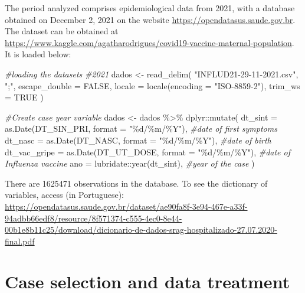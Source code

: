 \documentclass[
]{article}
\newenvironment{Shaded}{\begin{snugshade}}{\end{snugshade}}
\newcommand{\AttributeTok}[1]{\textcolor[rgb]{0.77,0.63,0.00}{#1}}
\newcommand{\CommentTok}[1]{\textcolor[rgb]{0.56,0.35,0.01}{\textit{#1}}}
\newcommand{\ConstantTok}[1]{\textcolor[rgb]{0.00,0.00,0.00}{#1}}
\newcommand{\FunctionTok}[1]{\textcolor[rgb]{0.00,0.00,0.00}{#1}}
\newcommand{\NormalTok}[1]{#1}
\newcommand{\OtherTok}[1]{\textcolor[rgb]{0.56,0.35,0.01}{#1}}
\newcommand{\SpecialCharTok}[1]{\textcolor[rgb]{0.00,0.00,0.00}{#1}}
\newcommand{\StringTok}[1]{\textcolor[rgb]{0.31,0.60,0.02}{#1}}
\begin{document}
The period analyzed comprises epidemiological data from 2021, with a
database obtained on December 2, 2021 on the website
\url{https://opendatasus.saude.gov.br}. The dataset can be obtained at
\url{https://www.kaggle.com/agatharodrigues/covid19-vaccine-maternal-population}.
It is loaded below:

\begin{Shaded}
\begin{Highlighting}[]
\CommentTok{\#loading the datasets}
\CommentTok{\#2021}
\NormalTok{dados }\OtherTok{\textless{}{-}} \FunctionTok{read\_delim}\NormalTok{(}
  \StringTok{"INFLUD21{-}29{-}11{-}2021.csv"}\NormalTok{,}
  \StringTok{";"}\NormalTok{,}
  \AttributeTok{escape\_double =} \ConstantTok{FALSE}\NormalTok{,}
  \AttributeTok{locale =} \FunctionTok{locale}\NormalTok{(}\AttributeTok{encoding =} \StringTok{"ISO{-}8859{-}2"}\NormalTok{),}
  \AttributeTok{trim\_ws =} \ConstantTok{TRUE}
\NormalTok{)}

\CommentTok{\#Create case year variable}
\NormalTok{dados }\OtherTok{\textless{}{-}}\NormalTok{  dados }\SpecialCharTok{\%\textgreater{}\%}
\NormalTok{  dplyr}\SpecialCharTok{::}\FunctionTok{mutate}\NormalTok{(}
    \AttributeTok{dt\_sint =} \FunctionTok{as.Date}\NormalTok{(DT\_SIN\_PRI, }\AttributeTok{format =} \StringTok{"\%d/\%m/\%Y"}\NormalTok{), }\CommentTok{\#date of first symptoms}
    \AttributeTok{dt\_nasc =} \FunctionTok{as.Date}\NormalTok{(DT\_NASC, }\AttributeTok{format =} \StringTok{"\%d/\%m/\%Y"}\NormalTok{), }\CommentTok{\#date of birth}
    \AttributeTok{dt\_vac\_gripe =} \FunctionTok{as.Date}\NormalTok{(DT\_UT\_DOSE, }\AttributeTok{format =} \StringTok{"\%d/\%m/\%Y"}\NormalTok{), }\CommentTok{\#date of Influenza vaccine}
    \AttributeTok{ano =}\NormalTok{ lubridate}\SpecialCharTok{::}\FunctionTok{year}\NormalTok{(dt\_sint), }\CommentTok{\#year of the case}
\NormalTok{  )}
\end{Highlighting}
\end{Shaded}

There are 1625471 observations in the database. To see the dictionary of
variables, access (in Portuguese):
\url{https://opendatasus.saude.gov.br/dataset/ae90fa8f-3e94-467e-a33f-94adbb66edf8/resource/8f571374-c555-4ec0-8e44-00b1e8b11c25/download/dicionario-de-dados-srag-hospitalizado-27.07.2020-final.pdf}

\hypertarget{case-selection-and-data-treatment}{%
\section{Case selection and data
treatment}\label{case-selection-and-data-treatment}}
\end{document}
